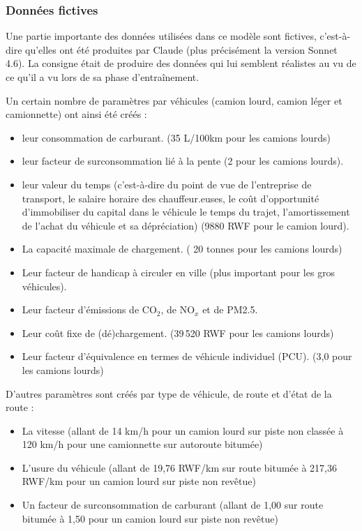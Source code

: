 \documentclass[12pt,a4paper,french]{report}
\begin{document}
	\subsubsection{Données fictives}
	\label{subsubsec:donnees_fictives}
	
	Une partie importante des données utilisées dans ce modèle sont fictives, c'est-à-dire qu'elles ont été produites par Claude (plus précisément la version Sonnet 4.6). La consigne était de produire des données qui lui semblent réalistes au vu de ce qu'il a vu lors de sa phase d'entraînement.
	
	Un certain nombre de paramètres par véhicules (camion lourd, camion léger et camionnette) ont ainsi été créés :
	
	\begin{itemize}
		\item leur consommation de carburant. (35 L/100km pour les camions lourds)
		\item leur facteur de surconsommation lié à la pente (2 pour les camions lourds).
		\item leur valeur du temps (c'est-à-dire du point de vue de l'entreprise de transport, le salaire horaire des chauffeur.euses, le coût d'opportunité d'immobiliser du capital dans le véhicule le temps du trajet, l'amortissement de l'achat du véhicule et sa dépréciation) (9880 RWF pour le camion lourd).
		\item La capacité maximale de chargement. ( 20 tonnes pour les camions lourds)
		\item Leur facteur de handicap à circuler en ville (plus important pour les gros véhicules).
		\item Leur facteur d'émissions de CO$_2$, de NO$_x$ et de PM2.5. 
		\item Leur coût fixe de (dé)chargement. (39\,520 RWF pour les camions lourds)
		\item Leur facteur d'équivalence en termes de véhicule individuel (PCU). (3,0 pour les camions lourds)
	\end{itemize}
	\medskip
	
	D'autres paramètres sont créés par type de véhicule, de route et d'état de la route :
	
	\begin{itemize}
		\item La vitesse (allant de 14 km/h pour un camion lourd sur piste non classée à 120 km/h pour une camionnette sur autoroute bitumée)
		\item L'usure du véhicule (allant de 19,76 RWF/km sur route bitumée à 217,36 RWF/km pour un camion lourd sur piste non revêtue)
		\item Un facteur de surconsommation de carburant (allant de 1,00 sur route bitumée à 1,50 pour un camion lourd sur piste non revêtue)
	\end{itemize}
	\medskip
	
\end{document}
